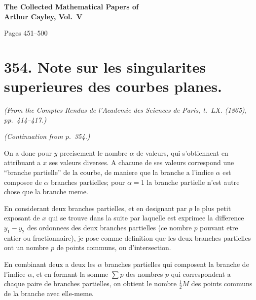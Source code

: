 \documentclass[11pt,a4paper]{article}
\theoremstyle{plain}
\begin{document}
\begin{center}
\Large\bfseries The Collected Mathematical Papers of\\ Arthur Cayley, Vol.~V
\end{center}
\vspace{0.5cm}
\begin{center}
\large Pages 451--500
\end{center}
\vspace{1cm}

\section*{354. Note sur les singularites superieures des courbes planes.\quad [354]}
\label{sec:354}

\begin{flushright}
\textit{(From the Comptes Rendus de l'Academie des Sciences de Paris, t.~LX. (1865), pp.~414--417.)}
\end{flushright}

\textit{(Continuation from p.~354.)}

\medskip

On a done pour $y$ precisement le nombre $\alpha$ de valeurs, qui s'obtiennent en attribuant a $x$ ses valeurs diverses. A chacune de ses valeurs correspond une ``branche partielle'' de la courbe, de maniere que la branche a l'indice $\alpha$ est composee de $\alpha$ branches partielles; pour $\alpha=1$ la branche partielle n'est autre chose que la branche meme.

En considerant deux branches partielles, et en designant par $p$ le plus petit exposant de $x$ qui se trouve dans la suite par laquelle est exprimee la difference $y_1 - y_2$ des ordonnees des deux branches partielles (ce nombre $p$ pouvant etre entier ou fractionnaire), je pose comme definition que les deux branches partielles ont un nombre $p$ de points communs, ou d'intersection.

En combinant deux a deux les $\alpha$ branches partielles qui composent la branche de l'indice $\alpha$, et en formant la somme $\sum p$ des nombres $p$ qui correspondent a chaque paire de branches partielles, on obtient le nombre $\frac12 M$ des points communs de la branche avec elle-meme.
\end{document}
